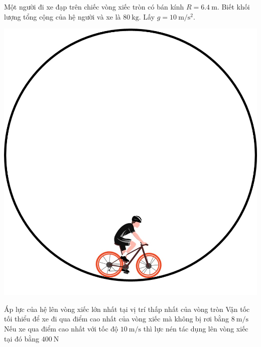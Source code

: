 \begin{ex}
Một người đi xe đạp trên chiếc vòng xiếc tròn có bán kính $R=\SI{6.4}{\meter}$. Biết khối lượng tổng cộng của hệ người và xe là $\SI{80}{\kilogram}$. Lấy $g=\SI{10}{\meter/\second^2}$.
\begin{center}
	\includegraphics[scale=0.25]{../figs/VN10-2023-PH-TP032-P-6}
\end{center}
{\True Áp lực của hệ lên vòng xiếc lớn nhất tại vị trí thấp nhất của vòng tròn}
{\True Vận tốc tối thiểu để xe đi qua điểm cao nhất của vòng xiếc mà không bị rơi bằng $\SI{8}{\meter/\second}$}
{Nếu xe qua điểm cao nhất với tốc độ $\SI{10}{\meter/\second}$ thì lực nén tác dụng lên vòng xiếc tại đó bằng $\SI{400}{\newton}$}
	\loigiai{}
\end{ex}
